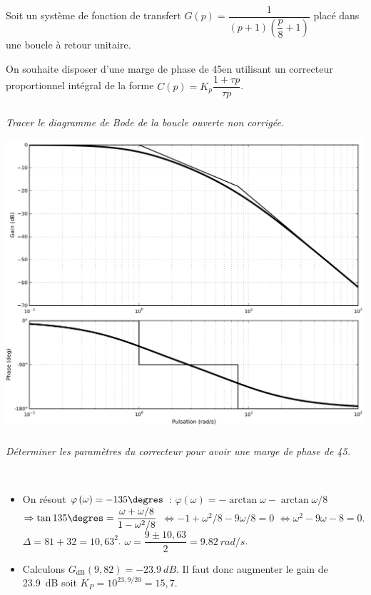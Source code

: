 \documentclass[10pt,fleqn]{article} %
\begin{document}
\begin{multicols}{2}
Soit un système de fonction de transfert $G(p)=\dfrac{1}{\left(p+1\right)\left(\dfrac{p}{8}+1\right)}$ placé dans une boucle à retour unitaire.

On souhaite disposer d'une marge de phase de 45\degres en utilisant un correcteur proportionnel intégral de la forme $C(p)=K_p\dfrac{1+\tau p}{\tau p}$.

\subparagraph{}\textit{Tracer le diagramme de Bode de la boucle ouverte non corrigée.}
\ifprof
\begin{corrige}
\begin{center}
\includegraphics[width=\linewidth]{images/PI_BodeNC}
\end{center}
\end{corrige}
\else
\fi

\subparagraph{}\textit{Déterminer les paramètres du correcteur pour avoir une marge de phase de 45\degres. }

\ifprof
\begin{corrige}~\\

\begin{itemize}
\item On résout $\varphi\left(\omega\right)=-135\degres$ : 
$\varphi\left(\omega\right)=-\arctan \omega-\arctan \omega/8 $ $\Rightarrow \tan 135\degres = \dfrac{\omega+\omega/8}{1-\omega^2/8}$ 
$\Leftrightarrow - 1+\omega^2/8-9\omega/8=0$ 
$\Leftrightarrow  \omega^2 -9\omega-8 =0$. 
$\Delta = 81+32=10,63^2$. 
$\omega = \dfrac{9\pm10,63}{2}=\SI{9,82}{rad/s}$.


\item Calculons $G_{\text{dB}}(9,82)=\SI{-23,9}{dB}$. Il faut donc augmenter le gain de \SI{23,9}{dB} soit $K_P=10^{23,9/20}=15,7$.


\end{itemize}
\end{corrige}
\end{multicols}
\end{document}

